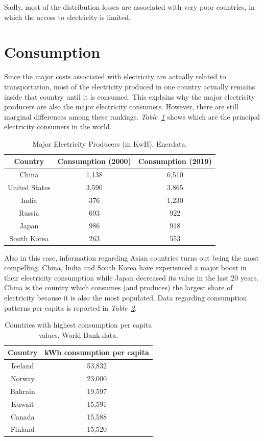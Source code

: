 \documentclass[a4paper,12pt]{book}
\begin{document}
Sadly, most of the distribution losses are associated with very poor countries, in which the access to electricity is limited. 

\section{Consumption}

Since the major costs associated with electricity are actually related to transportation, most of the electricity produced in one country actually remains inside that country until it is consumed. This explains why the major electricity producers are also the major electricity consumers. However, there are still marginal differences among these rankings. \textit{Table~\ref{Tab:producers}} shows which are the principal electricity consumers in the world.

\begin{table}[tb]
\begin{center}
\begin{tabular}{|c|c|c|}
\hline
Country & Consumption (2000) & Consumption (2019)\\
\hline
China & 1,138 & 6,510\\
United States & 3,590 & 3,865\\
India & 376 & 1,230\\
Russia & 693 & 922\\
Japan & 986 & 918\\
South Korea & 263 & 553\\
\hline
\end{tabular}
\caption{Major Electricity Producers (in KwH), Enerdata.}
\label{Tab:producers}
\end{center}
\end{table}

Also in this case, information regarding Asian countries turns out being the most compelling. China, India and South Korea have experienced a major boost in their electricity consumption while Japan decreased its value in the last 20 years. China is the country which consumes (and produces) the largest share of electricity because it is also the most populated. Data regarding consumption patterns per capita is reported in \textit{Table~\ref{Tab:cons}}.

\begin{table}[tb]
\begin{center}
\begin{tabular}{|c|c|}
\hline
Country & kWh consumption per capita\\
\hline
Iceland & 53,832\\
Norway & 23,000\\
Bahrain & 19,597\\
Kuwait & 15,591\\
Canada & 15,588\\
Finland & 15,520\\
\hline
\end{tabular}
\caption{Countries with highest consumption per capita values, World Bank data.}
\label{Tab:cons}
\end{center}
\end{table}
\end{document}
